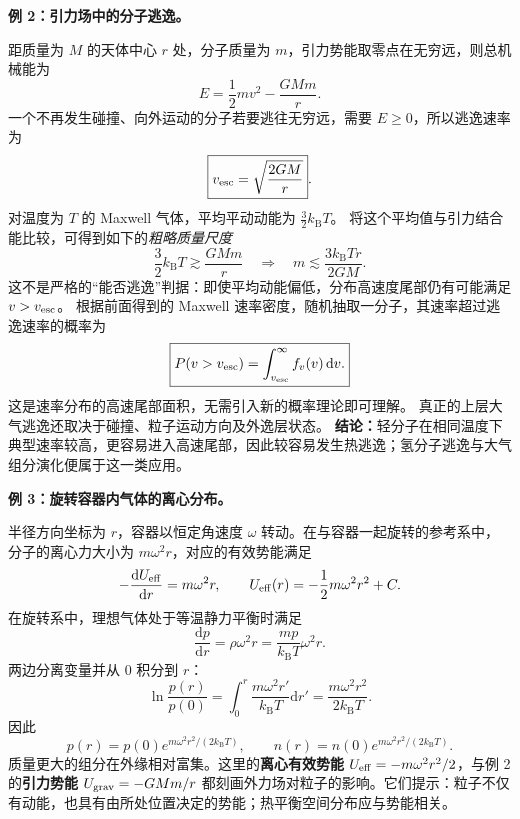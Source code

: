 \documentclass[11pt,a4paper,openany]{ctexbook}
\newcommand{\dd}{\mathrm d}
\newcommand{\kb}{k_{\mathrm B}}
\begin{document}
\begin{examplebox}
\textbf{例 2：引力场中的分子逃逸。}

距质量为 $M$ 的天体中心 $r$ 处，分子质量为 $m$，引力势能取零点在无穷远，则总机械能为
\[
E=\frac12mv^2-\frac{GMm}{r}.
\]
一个不再发生碰撞、向外运动的分子若要逃往无穷远，需要 $E\ge0$，所以逃逸速率为
\[
\boxed{v_{\rm esc}=\sqrt{\frac{2GM}{r}}}.
\]
对温度为 $T$ 的 Maxwell 气体，平均平动动能为 $\frac32\kb T$。
将这个平均值与引力结合能比较，可得到如下的\emph{粗略质量尺度}
\[
\frac32\kb T\gtrsim\frac{GMm}{r}
\quad\Longrightarrow\quad
m\lesssim\frac{3\kb Tr}{2GM}.
\]
这不是严格的“能否逃逸”判据：即使平均动能偏低，分布高速度尾部仍有可能满足 $v>v_{\rm esc}$。
根据前面得到的 Maxwell 速率密度，随机抽取一分子，其速率超过逃逸速率的概率为
\[
\boxed{P(v>v_{\rm esc})=\int_{v_{\rm esc}}^\infty f_v(v)\,\dd v.}
\]
这是速率分布的高速尾部面积，无需引入新的概率理论即可理解。
真正的上层大气逃逸还取决于碰撞、粒子运动方向及外逸层状态。
\textbf{结论：}轻分子在相同温度下典型速率较高，更容易进入高速尾部，因此较容易发生热逃逸；氢分子逃逸与大气组分演化便属于这一类应用。
\end{examplebox}

\begin{examplebox}
\textbf{例 3：旋转容器内气体的离心分布。}

半径方向坐标为 $r$，容器以恒定角速度 $\omega$ 转动。在与容器一起旋转的参考系中，分子的离心力大小为 $m\omega^2r$，对应的有效势能满足
\[
-\frac{\dd U_{\rm eff}}{\dd r}=m\omega^2r,
\qquad
U_{\rm eff}(r)=-\frac12m\omega^2r^2+C.
\]
在旋转系中，理想气体处于等温静力平衡时满足
\[
\frac{\dd p}{\dd r}=\rho\omega^2r
=\frac{mp}{\kb T}\omega^2r.
\]
两边分离变量并从 $0$ 积分到 $r$：
\[
\ln\frac{p(r)}{p(0)}
=\int_0^r\frac{m\omega^2r'}{\kb T}\dd r'
=\frac{m\omega^2r^2}{2\kb T}.
\]
因此
\[
\boxed{p(r)=p(0)e^{m\omega^2r^2/(2\kb T)}},\qquad
n(r)=n(0)e^{m\omega^2r^2/(2\kb T)}.
\]
质量更大的组分在外缘相对富集。这里的\textbf{离心有效势能}
$U_{\rm eff}=-m\omega^2r^2/2$，与例 2 的\textbf{引力势能}
$U_{\rm grav}=-GMm/r$ 都刻画外力场对粒子的影响。它们提示：粒子不仅有动能，也具有由所处位置决定的势能；热平衡空间分布应与势能相关。
\end{examplebox}
\end{document}
